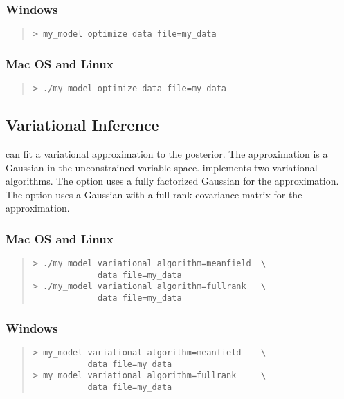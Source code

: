 \subsubsection{Windows}
%
\begin{quote}
\begin{Verbatim}[fontshape=sl]
> my_model optimize data file=my_data
\end{Verbatim}
\end{quote}

\subsubsection{Mac OS and Linux}
%
\begin{quote}
\begin{Verbatim}[fontshape=sl]
> ./my_model optimize data file=my_data
\end{Verbatim}
\end{quote}


\subsection{Variational Inference}

\CmdStan can fit a variational approximation to the posterior. The approximation
is a Gaussian in the unconstrained variable space. \Stan implements two
variational algorithms. The  option uses a fully
factorized Gaussian for the approximation. The  option
uses a Gaussian with a full-rank covariance matrix for the approximation.

\subsubsection{Mac OS and Linux}
%
\begin{quote}
\begin{Verbatim}[fontshape=sl]
> ./my_model variational algorithm=meanfield  \
             data file=my_data
> ./my_model variational algorithm=fullrank   \
             data file=my_data
\end{Verbatim}
\end{quote}

\subsubsection{Windows}
%
\begin{quote}
\begin{Verbatim}[fontshape=sl]
> my_model variational algorithm=meanfield    \
           data file=my_data
> my_model variational algorithm=fullrank     \
           data file=my_data
\end{Verbatim}
\end{quote}

